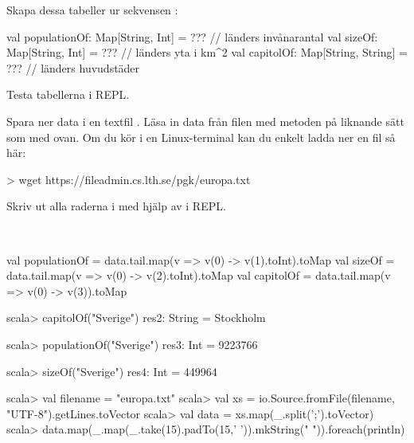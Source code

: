 \Subtask Skapa dessa tabeller ur sekvensen :
\begin{Code}
val populationOf: Map[String, Int]    = ???  // länders invånarantal
val sizeOf:       Map[String, Int]    = ???  // länders yta i km^2
val capitolOf:    Map[String, String] = ???  // länders huvudstäder
\end{Code}
Testa tabellerna i REPL.

\Subtask Spara ner data i en textfil . Läsa in data från filen med metoden  på liknande sätt som med   ovan. Om du kör i en Linux-terminal kan du enkelt ladda ner en fil så här:
\begin{REPLnonum}
> wget https://fileadmin.cs.lth.se/pgk/europa.txt
\end{REPLnonum}
Skriv ut alla raderna i  med hjälp av  i REPL.

\SOLUTION

\TaskSolved \what~

\SubtaskSolved
\begin{CodeSmall}
val populationOf = data.tail.map(v => v(0) -> v(1).toInt).toMap
val sizeOf       = data.tail.map(v => v(0) -> v(2).toInt).toMap
val capitolOf    = data.tail.map(v => v(0) -> v(3)).toMap
\end{CodeSmall}

\begin{REPL}
scala> capitolOf("Sverige")
res2: String = Stockholm

scala> populationOf("Sverige")
res3: Int = 9223766

scala> sizeOf("Sverige")
res4: Int = 449964
\end{REPL}

\begin{REPL}
scala> val filename = "europa.txt"
scala> val xs = io.Source.fromFile(filename, "UTF-8").getLines.toVector
scala> val data = xs.map(_.split(';').toVector)
scala> data.map(_.map(_.take(15).padTo(15,' ')).mkString(" ")).foreach(println)
\end{REPL}
\QUESTEND





\ExtraTasks %


\QUESTBEGIN

